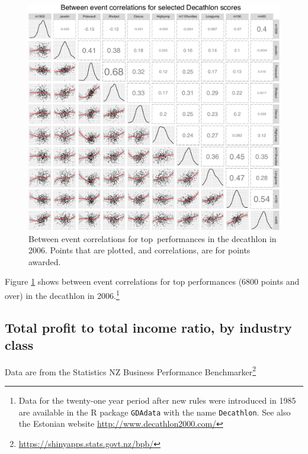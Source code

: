 \documentclass[
  10pt,
  b5paper]{book}
\begin{document}
\begin{figure}[H]

{\centering \includegraphics[width=0.9\linewidth]{07-regress_files/figure-latex/all10-1} 

}

\caption{Between event correlations for top performances in the 
decathlon in 2006.  Points that are plotted, and correlations, are 
for points awarded.}\label{fig:all10}
\end{figure}

Figure \ref{fig:all10} shows between event correlations for top
performances (6800 points and over) in the decathlon in
2006.\footnote{Data for the twenty-one year period after new rules were
  introduced in 1985 are available in the R package \texttt{GDAdata} with
  the name \texttt{Decathlon}. See also the Estonian website
  \url{http://www.decathlon2000.com/}}

\hypertarget{total-profit-to-total-income-ratio-by-industry-class}{%
\subsection*{Total profit to total income ratio, by industry class}\label{total-profit-to-total-income-ratio-by-industry-class}}

Data are from the Statistics NZ Business Performance
Benchmarker\footnote{\url{https://shinyapps.stats.govt.nz/bpb/}}
\end{document}

